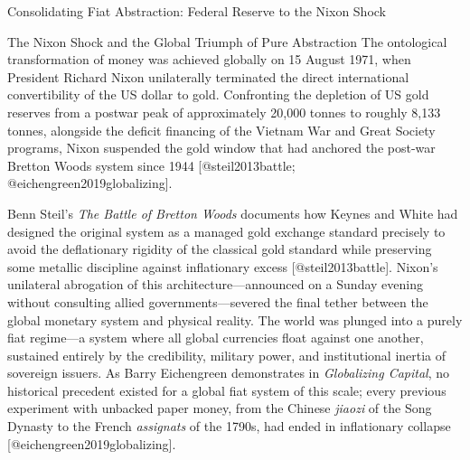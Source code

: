 \documentclass[
  ignorenonframetext,
]{beamer}
\begin{document}
\begin{frame}{Consolidating Fiat Abstraction: Federal Reserve to the
Nixon Shock}
\begin{block}{The Nixon Shock and the Global Triumph of Pure
Abstraction}
\protect{}\label{the-nixon-shock-and-the-global-triumph-of-pure-abstraction}
The ontological transformation of money was achieved globally on 15
August 1971, when President Richard Nixon unilaterally terminated the
direct international convertibility of the US dollar to gold.
Confronting the depletion of US gold reserves from a postwar peak of
approximately 20,000 tonnes to roughly 8,133 tonnes, alongside the
deficit financing of the Vietnam War and Great Society programs, Nixon
suspended the gold window that had anchored the post-war Bretton Woods
system since 1944 {[}@steil2013battle; @eichengreen2019globalizing{]}.

Benn Steil's \emph{The Battle of Bretton Woods} documents how Keynes and
White had designed the original system as a managed gold exchange
standard precisely to avoid the deflationary rigidity of the classical
gold standard while preserving some metallic discipline against
inflationary excess {[}@steil2013battle{]}. Nixon's unilateral
abrogation of this architecture---announced on a Sunday evening without
consulting allied governments---severed the final tether between the
global monetary system and physical reality. The world was plunged into
a purely fiat regime---a system where all global currencies float
against one another, sustained entirely by the credibility, military
power, and institutional inertia of sovereign issuers. As Barry
Eichengreen demonstrates in \emph{Globalizing Capital}, no historical
precedent existed for a global fiat system of this scale; every previous
experiment with unbacked paper money, from the Chinese \emph{jiaozi} of
the Song Dynasty to the French \emph{assignats} of the 1790s, had ended
in inflationary collapse {[}@eichengreen2019globalizing{]}.


\end{block}
\end{frame}
\end{document}
